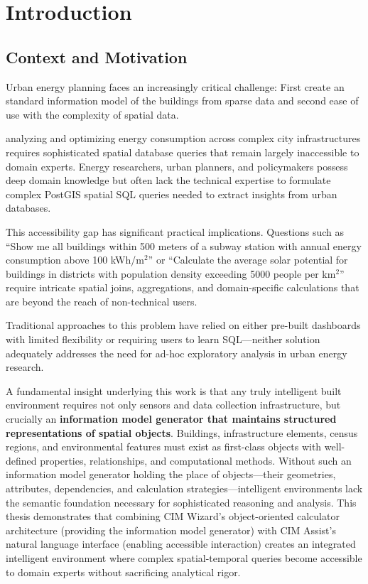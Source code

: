 \chapter{Introduction}
\label{ch:introduction}

\section{Context and Motivation}

Urban energy planning faces an increasingly critical challenge: First create an standard information model of the buildings from sparse data and second ease of use with the complexity of spatial data.

analyzing and optimizing energy consumption across complex city infrastructures requires sophisticated spatial database queries that remain largely inaccessible to domain experts. Energy researchers, urban planners, and policymakers possess deep domain knowledge but often lack the technical expertise to formulate complex PostGIS spatial SQL queries needed to extract insights from urban databases.

This accessibility gap has significant practical implications. Questions such as ``Show me all buildings within 500 meters of a subway station with annual energy consumption above 100 kWh/m$^2$'' or ``Calculate the average solar potential for buildings in districts with population density exceeding 5000 people per km$^2$'' require intricate spatial joins, aggregations, and domain-specific calculations that are beyond the reach of non-technical users.

Traditional approaches to this problem have relied on either pre-built dashboards with limited flexibility or requiring users to learn SQL---neither solution adequately addresses the need for ad-hoc exploratory analysis in urban energy research.

A fundamental insight underlying this work is that any truly intelligent built environment requires not only sensors and data collection infrastructure, but crucially an \textbf{information model generator that maintains structured representations of spatial objects}. Buildings, infrastructure elements, census regions, and environmental features must exist as first-class objects with well-defined properties, relationships, and computational methods. Without such an information model generator holding the place of objects---their geometries, attributes, dependencies, and calculation strategies---intelligent environments lack the semantic foundation necessary for sophisticated reasoning and analysis. This thesis demonstrates that combining CIM Wizard's object-oriented calculator architecture (providing the information model generator) with CIM Assist's natural language interface (enabling accessible interaction) creates an integrated intelligent environment where complex spatial-temporal queries become accessible to domain experts without sacrificing analytical rigor.

